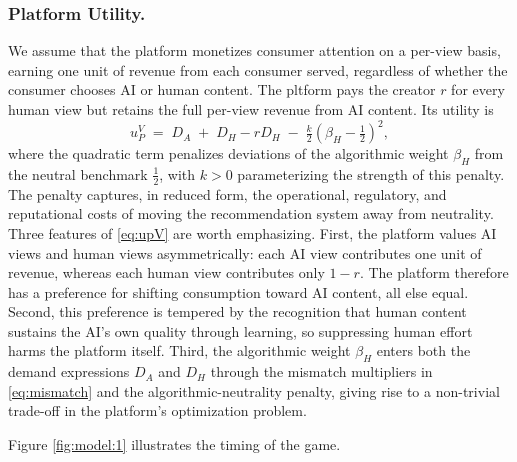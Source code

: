 \subsubsection*{Platform Utility.}
We assume that the platform monetizes consumer attention on a 
per-view basis, earning one unit of revenue from each consumer 
served, regardless of whether the consumer chooses AI or human 
content. The pltform pays the creator $r$ for every human view 
but retains the full per-view revenue from AI content. Its 
utility is
\begin{equation}\label{eq:upV}
u_P^{V} \;=\; D_A \;+\; D_H - r D_H 
\;-\; \tfrac{k}{2}\!\left(\beta_H - \tfrac{1}{2}\right)^{2}\!,
\end{equation}
where the quadratic term penalizes deviations of the algorithmic 
weight $\beta_H$ from the neutral benchmark $\tfrac{1}{2}$, with 
$k > 0$ parameterizing the strength of this penalty. The penalty 
captures, in reduced form, the operational, regulatory, and 
reputational costs of moving the recommendation system 
away from neutrality. Three features of \eqref{eq:upV} are worth 
emphasizing. First, the platform values AI views and human views 
asymmetrically: each AI view contributes one unit of  revenue, 
whereas each human view contributes only $1-r$. The platform 
therefore has a preference for shifting consumption 
toward AI content, all else equal. Second, this preference is 
tempered by the recognition that human content sustains the AI's 
own quality through learning, so suppressing human effort harms the platform itself. Third, the algorithmic weight $\beta_H$ enters 
both the demand expressions $D_A$ and $D_H$ through the mismatch 
multipliers in \eqref{eq:mismatch} and the algorithmic-neutrality 
penalty, giving rise to a non-trivial trade-off in the platform's 
optimization problem.

Figure \ref{fig:model:1} illustrates the timing of the game. 

